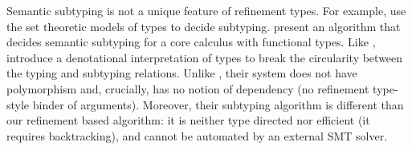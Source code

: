   Semantic subtyping is not a unique feature of refinement types. 
  For example, \citet{Castagna02} use the set theoretic models of types 
  to decide subtyping. 
  \citet{Castagna05} present an algorithm that decides semantic subtyping 
  for a core calculus with functional types. 
  Like \sysrf, \citet{Castagna05} introduce a denotational interpretation of types 
  to break the circularity between the typing and subtyping relations.
  Unlike \sysrf, their system does not have polymorphism and, crucially, has no notion of dependency
  (no refinement type-style binder of arguments).
  Moreover, their subtyping algorithm is different than our refinement based algorithm:
  it is neither type directed nor efficient (\ie it requires backtracking), and
  cannot be automated by an external SMT solver. 

